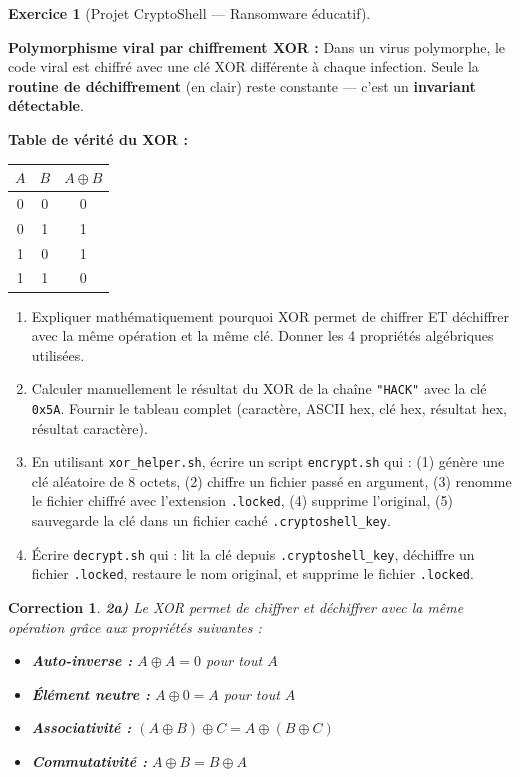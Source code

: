 \documentclass[a4paper,11pt]{article}
\theoremstyle{plain}
\newtheorem{correction}{Correction}
\theoremstyle{definition}
\newtheorem{exercice}{Exercice}
\begin{document}
\begin{exercice}[Projet CryptoShell --- Ransomware éducatif]
\begin{rappel}
\medskip
\textbf{Polymorphisme viral par chiffrement XOR :} Dans un virus polymorphe, le code viral est chiffré avec une clé XOR différente à chaque infection. Seule la \textbf{routine de déchiffrement} (en clair) reste constante --- c'est un \textbf{invariant détectable}.

\medskip
\textbf{Table de vérité du XOR :}
\begin{center}
\begin{tabular}{cc|c}
$A$ & $B$ & $A \oplus B$ \\
\midrule
0 & 0 & 0 \\
0 & 1 & 1 \\
1 & 0 & 1 \\
1 & 1 & 0 \\
\end{tabular}
\end{center}
\end{rappel}

\begin{enumerate}
\item[\textbf{2a)}] Expliquer mathématiquement pourquoi XOR permet de chiffrer ET déchiffrer avec la même opération et la même clé. Donner les 4 propriétés algébriques utilisées.

\item[\textbf{2b)}] Calculer manuellement le résultat du XOR de la chaîne \texttt{"HACK"} avec la clé \texttt{0x5A}. Fournir le tableau complet (caractère, ASCII hex, clé hex, résultat hex, résultat caractère).

\item[\textbf{2c)}] En utilisant \texttt{xor\_helper.sh}, écrire un script \texttt{encrypt.sh} qui : (1) génère une clé aléatoire de 8 octets, (2) chiffre un fichier passé en argument, (3) renomme le fichier chiffré avec l'extension \texttt{.locked}, (4) supprime l'original, (5) sauvegarde la clé dans un fichier caché \texttt{.cryptoshell\_key}.

\item[\textbf{2d)}] Écrire \texttt{decrypt.sh} qui : lit la clé depuis \texttt{.cryptoshell\_key}, déchiffre un fichier \texttt{.locked}, restaure le nom original, et supprime le fichier \texttt{.locked}.
\end{enumerate}

\begin{correction}

\textbf{2a)} Le XOR permet de chiffrer et déchiffrer avec la même opération grâce aux propriétés suivantes :
\begin{itemize}
    \item \textbf{Auto-inverse :} $A \oplus A = 0$ pour tout $A$
    \item \textbf{Élément neutre :} $A \oplus 0 = A$ pour tout $A$
    \item \textbf{Associativité :} $(A \oplus B) \oplus C = A \oplus (B \oplus C)$
    \item \textbf{Commutativité :} $A \oplus B = B \oplus A$
\end{itemize}


\end{correction}
\end{exercice}
\end{document}
